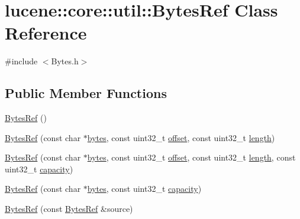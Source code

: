 \hypertarget{classlucene_1_1core_1_1util_1_1BytesRef}{}\section{lucene\+:\+:core\+:\+:util\+:\+:Bytes\+Ref Class Reference}
\label{classlucene_1_1core_1_1util_1_1BytesRef}


{\ttfamily \#include $<$Bytes.\+h$>$}

\subsection*{Public Member Functions}
\begin{DoxyCompactItemize}
\item 
\mbox{\hyperlink{classlucene_1_1core_1_1util_1_1BytesRef_a5c352a399671a6ed5e04cd334149b662}{Bytes\+Ref}} ()
\item 
\mbox{\hyperlink{classlucene_1_1core_1_1util_1_1BytesRef_aafacc8aec4dc0494f42d91876b64bb17}{Bytes\+Ref}} (const char $\ast$\mbox{\hyperlink{classlucene_1_1core_1_1util_1_1BytesRef_a50b260da81b7f31687ac167ff52c9a1c}{bytes}}, const uint32\+\_\+t \mbox{\hyperlink{classlucene_1_1core_1_1util_1_1BytesRef_a00b5e81a37602c7af1fde636cd44f12b}{offset}}, const uint32\+\_\+t \mbox{\hyperlink{classlucene_1_1core_1_1util_1_1BytesRef_a198e62928759942ffc9d2c3ff877b4e4}{length}})
\item 
\mbox{\hyperlink{classlucene_1_1core_1_1util_1_1BytesRef_a3cb2618be430384290cd84c488f8b07d}{Bytes\+Ref}} (const char $\ast$\mbox{\hyperlink{classlucene_1_1core_1_1util_1_1BytesRef_a50b260da81b7f31687ac167ff52c9a1c}{bytes}}, const uint32\+\_\+t \mbox{\hyperlink{classlucene_1_1core_1_1util_1_1BytesRef_a00b5e81a37602c7af1fde636cd44f12b}{offset}}, const uint32\+\_\+t \mbox{\hyperlink{classlucene_1_1core_1_1util_1_1BytesRef_a198e62928759942ffc9d2c3ff877b4e4}{length}}, const uint32\+\_\+t \mbox{\hyperlink{classlucene_1_1core_1_1util_1_1BytesRef_a9e1775d26ac1dec137aa57fae87f654c}{capacity}})
\item 
\mbox{\hyperlink{classlucene_1_1core_1_1util_1_1BytesRef_aad74198593bb0663f505c2751940b68b}{Bytes\+Ref}} (const char $\ast$\mbox{\hyperlink{classlucene_1_1core_1_1util_1_1BytesRef_a50b260da81b7f31687ac167ff52c9a1c}{bytes}}, const uint32\+\_\+t \mbox{\hyperlink{classlucene_1_1core_1_1util_1_1BytesRef_a9e1775d26ac1dec137aa57fae87f654c}{capacity}})
\item 
\mbox{\hyperlink{classlucene_1_1core_1_1util_1_1BytesRef_ab49453782bcf181a44128375bcada802}{Bytes\+Ref}} (const \mbox{\hyperlink{classlucene_1_1core_1_1util_1_1BytesRef}{Bytes\+Ref}} \&source)

\end{DoxyCompactItemize}
